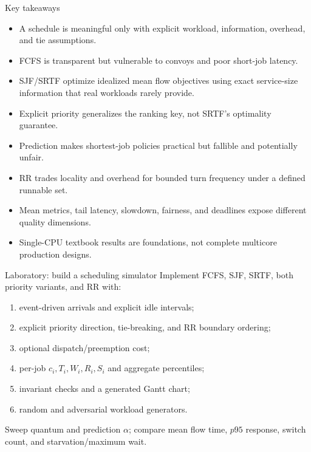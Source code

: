 \documentclass[aspectratio=169,11pt]{beamer}
\begin{document}
\begin{frame}{Key takeaways}
  \begin{itemize}
    \item A schedule is meaningful only with explicit workload, information, overhead, and tie assumptions.
    \item FCFS is transparent but vulnerable to convoys and poor short-job latency.
    \item SJF/SRTF optimize idealized mean flow objectives using exact service-size information that real workloads rarely provide.
    \item Explicit priority generalizes the ranking key, not SRTF's optimality guarantee.
    \item Prediction makes shortest-job policies practical but fallible and potentially unfair.
    \item RR trades locality and overhead for bounded turn frequency under a defined runnable set.
    \item Mean metrics, tail latency, slowdown, fairness, and deadlines expose different quality dimensions.
    \item Single-CPU textbook results are foundations, not complete multicore production designs.
  \end{itemize}
\end{frame}

\begin{frame}{Laboratory: build a scheduling simulator}
  Implement FCFS, SJF, SRTF, both priority variants, and RR with:
  \begin{enumerate}
    \item event-driven arrivals and explicit idle intervals;
    \item explicit priority direction, tie-breaking, and RR boundary ordering;
    \item optional dispatch/preemption cost;
    \item per-job $c_i,T_i,W_i,R_i,S_i$ and aggregate percentiles;
    \item invariant checks and a generated Gantt chart;
    \item random and adversarial workload generators.
  \end{enumerate}
  \begin{tcolorbox}[title=Experiment]
    Sweep quantum and prediction $\alpha$; compare mean flow time, $p95$ response, switch count, and starvation/maximum wait.
  \end{tcolorbox}
\end{frame}
\end{document}
